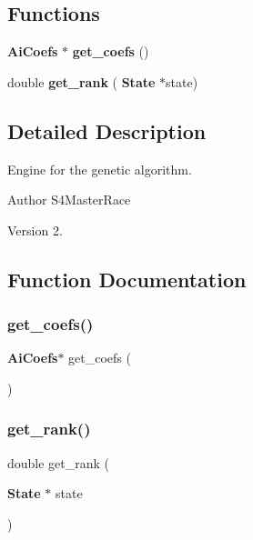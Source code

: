 \subsection*{Functions}
\begin{DoxyCompactItemize}
\item 
\textbf{ Ai\+Coefs} $\ast$ \textbf{ get\+\_\+coefs} ()
\item 
double \textbf{ get\+\_\+rank} (\textbf{ State} $\ast$state)
\end{DoxyCompactItemize}


\subsection{Detailed Description}
Engine for the genetic algorithm. 

\begin{DoxyAuthor}{Author}
S4\+Master\+Race 
\end{DoxyAuthor}
\begin{DoxyVersion}{Version}
2. 
\end{DoxyVersion}


\subsection{Function Documentation}
\mbox{\label{engine_8h_aa3954072faa56eb56911abf3b27ea25e}} 
\subsubsection{get\+\_\+coefs()}
{\footnotesize\ttfamily \textbf{ Ai\+Coefs}$\ast$ get\+\_\+coefs (\begin{DoxyParamCaption}{ }\end{DoxyParamCaption})}

\mbox{\label{engine_8h_ac881f0868dfdb55b606f2288c56e4430}} 
\subsubsection{get\+\_\+rank()}
{\footnotesize\ttfamily double get\+\_\+rank (\begin{DoxyParamCaption}\item[{\textbf{ State} $\ast$}]{state }\end{DoxyParamCaption})}

